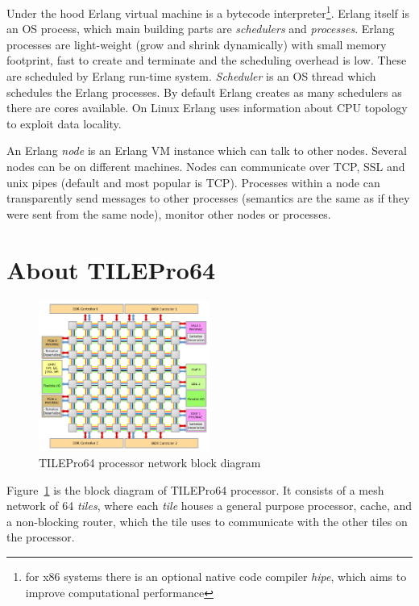 \documentclass[english,11pt]{l4proj}
\begin{document}
Under the hood Erlang virtual machine is a bytecode interpreter\footnote{for x86
systems there is an optional native code compiler \emph{hipe}\cite{hipe}, which
aims to improve computational performance}. Erlang itself is an OS process,
which main building parts are {\em schedulers} and {\em processes}. Erlang
processes are light-weight (grow and shrink dynamically) with small memory
footprint, fast to create and terminate and the scheduling overhead is low.
These are scheduled by Erlang run-time system. {\em Scheduler} is an OS thread
which schedules the Erlang processes. By default Erlang creates as many
schedulers as there are cores available. On Linux Erlang uses information about
CPU topology to exploit data locality.

An Erlang {\em node} is an Erlang VM instance which can talk to other nodes.
Several nodes can be on different machines. Nodes can communicate over TCP, SSL
and unix pipes (default and most popular is TCP). Processes within a node can
transparently send messages to other processes (semantics are the same as if
they were sent from the same node), monitor other nodes or processes.

\section{About TILEPro64}
\label{sec:tilera}

\begin{figure}
    \centering
    \includegraphics[width=0.5\textwidth]{images/tile64.pdf}
    \caption{TILEPro64 processor network block diagram}
    \label{fig:tile64}
\end{figure}

Figure~\ref{fig:tile64} is the block diagram of TILEPro64 processor. It consists
of a mesh network of 64 {\em tiles}, where each {\em tile} houses a general
purpose processor, cache, and a non-blocking router, which the tile uses to
communicate with the other tiles on the processor.
\end{document}
